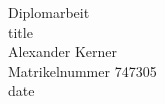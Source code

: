\begin{titlepage}
	\vspace*{2cm}
	\begin{center}
		\Huge
		Diplomarbeit \\
		\vspace{1cm}
		title \\
		\large
		\vspace{1.5cm}
		Alexander Kerner \\
		Matrikelnummer 747305 \\
		date
	\end{center}
	\normalsize
	\vfill
	
\end{titlepage}